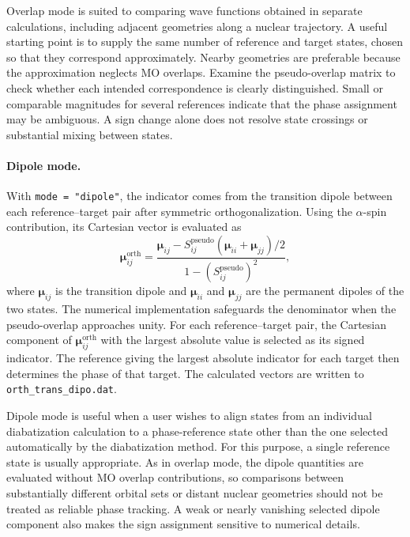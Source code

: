 Overlap mode is suited to comparing wave functions obtained in separate calculations, including adjacent geometries along a nuclear trajectory. A useful starting point is to supply the same number of reference and target states, chosen so that they correspond approximately. Nearby geometries are preferable because the approximation neglects MO overlaps. Examine the pseudo-overlap matrix to check whether each intended correspondence is clearly distinguished. Small or comparable magnitudes for several references indicate that the phase assignment may be ambiguous. A sign change alone does not resolve state crossings or substantial mixing between states.

\paragraph{Dipole mode.}
With \texttt{mode = "dipole"}, the indicator comes from the transition dipole between each reference--target pair after symmetric orthogonalization. Using the $\alpha$-spin contribution, its Cartesian vector is evaluated as
\begin{equation}
  \boldsymbol\mu_{ij}^{\mathrm{orth}} =
  \frac{\boldsymbol\mu_{ij}-S_{ij}^{\mathrm{pseudo}}
  (\boldsymbol\mu_{ii}+\boldsymbol\mu_{jj})/2}
  {1-(S_{ij}^{\mathrm{pseudo}})^2},
\end{equation}
where $\boldsymbol\mu_{ij}$ is the transition dipole and $\boldsymbol\mu_{ii}$ and $\boldsymbol\mu_{jj}$ are the permanent dipoles of the two states. The numerical implementation safeguards the denominator when the pseudo-overlap approaches unity. For each reference--target pair, the Cartesian component of $\boldsymbol\mu_{ij}^{\mathrm{orth}}$ with the largest absolute value is selected as its signed indicator. The reference giving the largest absolute indicator for each target then determines the phase of that target. The calculated vectors are written to \texttt{orth\_trans\_dipo.dat}.

Dipole mode is useful when a user wishes to align states from an individual diabatization calculation to a phase-reference state other than the one selected automatically by the diabatization method. For this purpose, a single reference state is usually appropriate. As in overlap mode, the dipole quantities are evaluated without MO overlap contributions, so comparisons between substantially different orbital sets or distant nuclear geometries should not be treated as reliable phase tracking. A weak or nearly vanishing selected dipole component also makes the sign assignment sensitive to numerical details.

